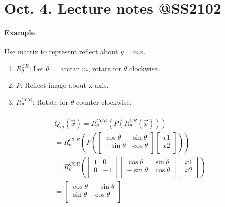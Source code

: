 \documentclass{article}
\begin{document}
	\section{Oct. 4. Lecture notes @SS2102}
	\paragraph{Example} Use matrix to represent reflect about $y = m x$.
	\begin{enumerate}
		\item $R_{\theta}^{CR}$: Let $\theta = \arctan{m}$, rotate for $\theta$ clockwise.
		\item $P$: Reflect image about x-axis.
		\item $R_{\theta}^{CCR}$: Rotate for $\theta$ counter-clockwise.
	\end{enumerate}
	\begin{multline}
		\\
		Q_m(\vec{x}) = R_\theta^{CCR} ( P (R_\theta^{CR}(\vec{x})) )\\
		= R_\theta^{CCR}(P(
		\begin{bmatrix}
			\cos{\theta} & \sin{\theta} \\
			-\sin{\theta} & \cos{\theta}\\
		\end{bmatrix}
		\begin{bmatrix}
			x1 \\ x2\\
		\end{bmatrix}
		))\\
		= R_\theta^{CCR}(
		\begin{bmatrix}
			1 & 0 \\
			0 & -1 \\
		\end{bmatrix}
		\begin{bmatrix}
			\cos{\theta} & \sin{\theta} \\
			-\sin{\theta} & \cos{\theta}\\
		\end{bmatrix}
		\begin{bmatrix}
			x1 \\ x2\\
		\end{bmatrix}
		) \\
		= \begin{bmatrix}
			\cos{\theta} & - \sin{\theta} \\
			\sin{\theta} & \cos{\theta} \\
		\end{bmatrix}

\end{multline}
\end{document}
